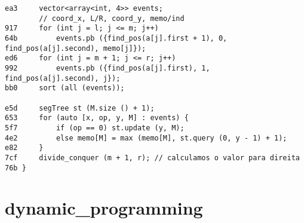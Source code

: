 \documentclass[11pt, a4paper, twoside]{article}
\begin{document}
\begin{lstlisting}
ea3     vector<array<int, 4>> events;
        // coord_x, L/R, coord_y, memo/ind
917     for (int j = l; j <= m; j++)
64b         events.pb ({find_pos(a[j].first + 1), 0, find_pos(a[j].second), memo[j]});
ed6     for (int j = m + 1; j <= r; j++)
992         events.pb ({find_pos(a[j].first), 1, find_pos(a[j].second), j});
bb0     sort (all (events));
    
e5d     segTree st (M.size () + 1);
653     for (auto [x, op, y, M] : events) {
5f7         if (op == 0) st.update (y, M);
4e2         else memo[M] = max (memo[M], st.query (0, y - 1) + 1);
e82     }
7cf     divide_conquer (m + 1, r); // calculamos o valor para direita
76b }
\end{lstlisting}



%
%

\section{dynamic_programming}
\end{document}
